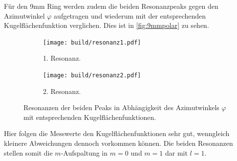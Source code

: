 Für den 9\;mm Ring werden zudem die beiden Resonanzpeaks gegen den Azimutwinkel $\varphi$ aufgetragen 
und wiederum mit der entsprechenden Kugelflächenfunktion verglichen. Dies ist in \autoref{fig:9mmpolar}
zu sehen.
\begin{figure}
    \centering
    \begin{subfigure}[b]{0.48\textwidth}
        \centering
        \texttt{[image: build/resonanz1.pdf]}
        \caption{1. Resonanz.}
    \end{subfigure}
    \hfill
    \begin{subfigure}[b]{0.48\textwidth}
        \centering
        \texttt{[image: build/resonanz2.pdf]}
        \caption{2. Resonanz.}
    \end{subfigure}
    \hfill
    \caption{Resonanzen der beiden Peaks in Abhängigkeit des Azimutwinkels $\varphi$ mit entsprechenden Kugelflächenfunktionen.}
    \label{fig:9mmpolar}
\end{figure}
Hier folgen die Messwerte den Kugelflächenfunktionen sehr gut, wenngleich kleinere Abweichungen dennoch
vorkommen können. Die beiden Resonanzen stellen somit die $m$-Aufspaltung in $m = 0$ und $m = 1$ dar mit 
$l = 1$. 

